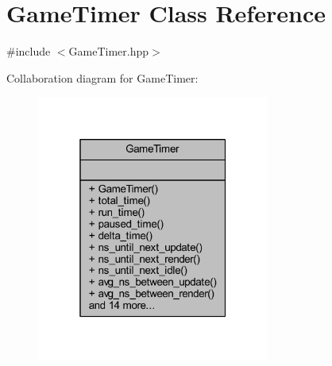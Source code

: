 \hypertarget{class_game_timer}{}\section{Game\+Timer Class Reference}
\label{class_game_timer}


{\ttfamily \#include $<$Game\+Timer.\+hpp$>$}



Collaboration diagram for Game\+Timer\+:\nopagebreak
\begin{figure}[H]
\begin{center}
\leavevmode
\includegraphics[width=217pt]{class_game_timer__coll__graph}
\end{center}
\end{figure}
